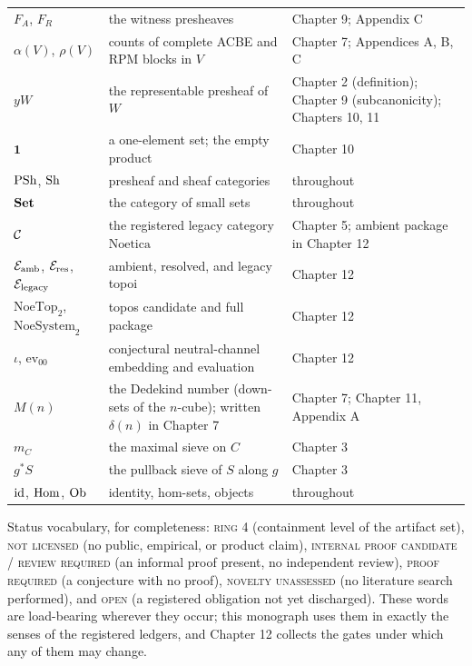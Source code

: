 \begin{longtable}{@{}l >{\raggedright\arraybackslash}p{} >{\raggedright\arraybackslash}p{}@{}}
$F_A$, $F_R$ & the witness presheaves & Chapter 9; Appendix C \\
$\alpha(V)$, $\rho(V)$ & counts of complete ACBE and RPM blocks in $V$ &
Chapter 7; Appendices A, B, C \\
$yW$ & the representable presheaf of $W$ & Chapter 2 (definition);
Chapter 9 (subcanonicity); Chapters 10, 11 \\
$\mathbf{1}$ & a one-element set; the empty product & Chapter 10 \\
$\mathrm{PSh}$, $\mathrm{Sh}$ & presheaf and sheaf categories & throughout \\
$\mathbf{Set}$ & the category of small sets & throughout \\
$\mathcal{C}$ & the registered legacy category $\mathrm{Noetica}$ &
Chapter 5; ambient package in Chapter 12 \\
$\mathcal{E}_{\mathrm{amb}}$, $\mathcal{E}_{\mathrm{res}}$, $\mathcal{E}_{\mathrm{legacy}}$ & ambient, resolved, and legacy topoi &
Chapter 12 \\
$\mathrm{NoeTop}_2$, $\mathrm{NoeSystem}_2$ & topos candidate and
full package & Chapter 12 \\
$\iota$, $\mathrm{ev}_{00}$ & conjectural neutral-channel embedding
and evaluation & Chapter 12 \\
$M(n)$ & the Dedekind number (down-sets of the $n$-cube); written
$\delta(n)$ in Chapter 7 & Chapter 7; Chapter 11, Appendix A \\
$m_C$ & the maximal sieve on $C$ & Chapter 3 \\
$g^{*}S$ & the pullback sieve of $S$ along $g$ & Chapter 3 \\
$\mathrm{id}$, $\mathrm{Hom}$, $\mathrm{Ob}$ & identity, hom-sets, objects & throughout \\
\end{longtable}

\begin{remark}
\label{appD:rem:statusvocab}
Status vocabulary, for completeness: \textsc{ring 4} (containment
level of the artifact set), \textsc{not licensed} (no public,
empirical, or product claim), \textsc{internal proof candidate /
review required} (an informal proof present, no independent review),
\textsc{proof required} (a conjecture with no proof),
\textsc{novelty unassessed} (no literature search performed), and
\textsc{open} (a registered obligation not yet discharged). These
words are load-bearing wherever they occur; this monograph uses them
in exactly the senses of the registered ledgers, and Chapter 12
collects the gates under which any of them may change.
\end{remark}
